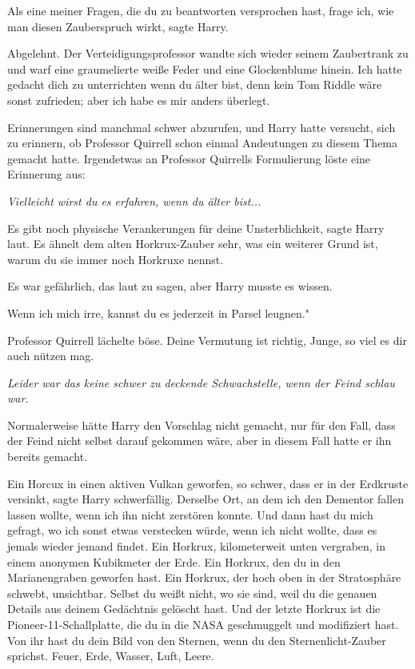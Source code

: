 \glqq{}Als eine meiner Fragen, die du zu beantworten versprochen hast, frage ich,
wie man diesen Zauberspruch wirkt\grqq{}, sagte Harry.

\glqq{}Abgelehnt.\grqq{} Der Verteidigungsprofessor wandte sich wieder seinem
Zaubertrank zu und warf eine graumelierte weiße Feder und eine Glockenblume
hinein. \glqq{}Ich hatte gedacht dich zu unterrichten wenn du älter bist, denn
kein Tom Riddle wäre sonst zufrieden; aber ich habe es mir anders
überlegt.\grqq{}

Erinnerungen sind manchmal schwer abzurufen, und Harry hatte versucht, sich zu
erinnern, ob Professor Quirrell schon einmal Andeutungen zu diesem Thema gemacht
hatte. Irgendetwas an Professor Quirrells Formulierung löste eine Erinnerung
aus:

\emph{Vielleicht wirst du es erfahren, wenn du älter bist...}

\glqq{}Es gibt noch physische Verankerungen für deine Unsterblichkeit\grqq{},
sagte Harry laut. \glqq{}Es ähnelt dem alten Horkrux-Zauber sehr, was ein
weiterer Grund ist, warum du sie immer noch Horkruxe nennst.\grqq{}

Es war gefährlich, das laut zu sagen, aber Harry musste es wissen.

\glqq{}Wenn ich mich irre, kannst du es jederzeit in Parsel leugnen."

Professor Quirrell lächelte böse. \glqq{}Deine Vermutung ist richtig, Junge, so
viel es dir auch nützen mag.\grqq{}

\emph{Leider war das keine schwer zu deckende Schwachstelle, wenn der Feind
schlau war.}

Normalerweise hätte Harry den Vorschlag nicht gemacht, nur für den Fall, dass
der Feind nicht selbst darauf gekommen wäre, aber in diesem Fall hatte er ihn
bereits gemacht.

\glqq{}Ein Horcux in einen aktiven Vulkan geworfen, so schwer, dass er in der
Erdkruste versinkt\grqq{}, sagte Harry schwerfällig. \glqq{}Derselbe Ort, an dem
ich den Dementor fallen lassen wollte, wenn ich ihn nicht zerstören konnte. Und
dann hast du mich gefragt, wo ich sonst etwas verstecken würde, wenn ich nicht
wollte, dass es jemals wieder jemand findet. Ein Horkrux, kilometerweit unten
vergraben, in einem anonymen Kubikmeter der Erde. Ein Horkrux, den du in den
Marianengraben geworfen hast. Ein Horkrux, der hoch oben in der Stratosphäre
schwebt, unsichtbar. Selbst du weißt nicht, wo sie sind, weil du die genauen
Details aus deinem Gedächtnis gelöscht hast. Und der letzte Horkrux ist die
Pioneer-11-Schallplatte, die du in die NASA geschmuggelt und modifiziert hast.
Von ihr hast du dein Bild von den Sternen, wenn du den Sternenlicht-Zauber
sprichst. Feuer, Erde, Wasser, Luft, Leere.\grqq{}

